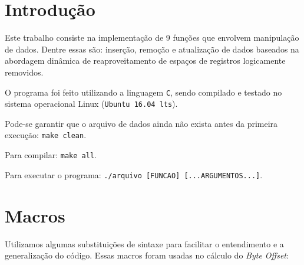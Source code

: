 \documentclass[
	12pt,				%
	openany,			%
	twoside,			%
	a4paper,			%
	english,			%
	french,				%
	spanish,			%
	brazil,				%
]{abntex2}
\begin{document}

	\frenchspacing 


	\imprimircapa


	\tableofcontents*
	\cleardoublepage


	\textual

	\section{Introdução}

		Este trabalho consiste na implementação de 9 funções que envolvem manipulação de dados. Dentre essas são: inserção, remoção e atualização de dados baseados na abordagem dinâmica de reaproveitamento de espaços de registros logicamente removidos.

		O programa foi feito utilizando a linguagem \verb|C|, sendo compilado e testado no sistema operacional Linux (\verb|Ubuntu 16.04 lts|).

		Pode-se garantir que o arquivo de dados ainda não exista antes da primeira execução: \verb|make clean|.

		Para compilar: \verb|make all|.

		Para executar o programa: \verb|./arquivo [FUNCAO] [...ARGUMENTOS...]|.

	\section{Macros}

		Utilizamos algumas substituições de sintaxe para facilitar o entendimento e a generalização do código. Essas macros foram usadas no cálculo do \textit{Byte Offset}:
\end{document}
